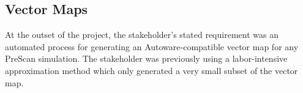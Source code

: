 \documentclass[12pt,twoside]{article}
\begin{document}


\subsection{Vector Maps}
At the outset of the project, the stakeholder's stated requirement was an automated process for generating an Autoware-compatible vector map for any PreScan simulation. The stakeholder was previously using a labor-intensive approximation method which only generated a very small subset of the vector map.
\end{document}
